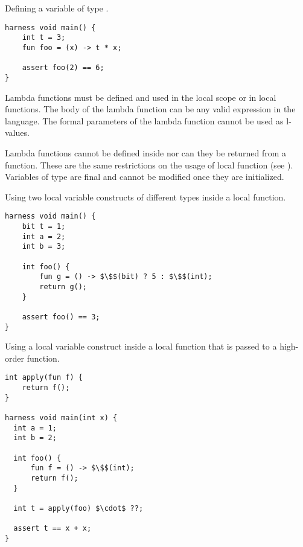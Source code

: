 \begin{Example}
Defining a variable of type .
\begin{lstlisting}
harness void main() {
    int t = 3;
    fun foo = (x) -> t * x;

    assert foo(2) == 6;
}
\end{lstlisting}

\end{Example}

Lambda functions must be defined and used in the local scope or in local functions. The body of the lambda function can be any valid expression in the language. The formal parameters of the lambda function cannot be used as l-values.

Lambda functions cannot be defined inside  nor can they be returned from a function. These are the same restrictions on the usage of local function (see ). Variables of type  are final and cannot be modified once they are initialized.

\begin{Example}
Using two local variable constructs of different types inside a local function.
\begin{lstlisting}
harness void main() {
    bit t = 1;
    int a = 2;
    int b = 3;

    int foo() {
        fun g = () -> $\$$(bit) ? 5 : $\$$(int);
        return g();
    }

    assert foo() == 3;
}
\end{lstlisting}

\end{Example}


\begin{Example}
Using a local variable construct inside a local function that is passed to a high-order function.
\begin{lstlisting}
int apply(fun f) {
    return f();
}

harness void main(int x) {
  int a = 1;
  int b = 2;

  int foo() {
      fun f = () -> $\$$(int);
      return f();
  }

  int t = apply(foo) $\cdot$ ??;

  assert t == x + x;
}
\end{lstlisting}

\end{Example}


